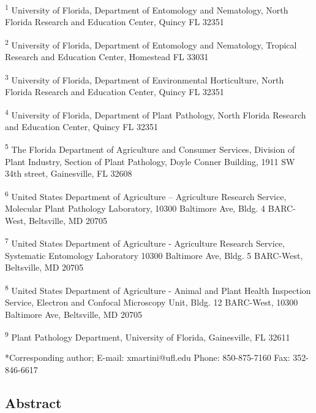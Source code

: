 \documentclass[12pt,final,CPage]{ufthesis}
\begin{document}
{  \textsuperscript{1} University of Florida, Department of Entomology and Nematology, North Florida Research and Education Center, Quincy FL 32351

  \textsuperscript{2} University of Florida, Department of Entomology and Nematology, Tropical Research and Education Center, Homestead FL 33031

  \textsuperscript{3} University of Florida, Department of Environmental Horticulture, North Florida Research and Education Center, Quincy FL 32351

  \textsuperscript{4} University of Florida, Department of Plant Pathology, North Florida Research and Education Center, Quincy FL 32351

  \textsuperscript{5} The Florida Department of Agriculture and Consumer Services, Division of Plant Industry, Section of Plant Pathology, Doyle Conner Building, 1911 SW 34th street, Gainesville, FL 32608

  \textsuperscript{6} United States Department of Agriculture -- Agriculture Research Service, Molecular Plant Pathology Laboratory, 10300 Baltimore Ave, Bldg. 4 BARC-West, Beltsville, MD 20705

  \textsuperscript{7} United States Department of Agriculture - Agriculture Research Service, Systematic Entomology Laboratory 10300 Baltimore Ave, Bldg. 5 BARC-West, Beltsville, MD 20705

  \textsuperscript{8} United States Department of Agriculture - Animal and Plant Health Inspection Service, Electron and Confocal Microscopy Unit, Bldg. 12 BARC-West, 10300 Baltimore Ave, Beltsville, MD 20705

  \textsuperscript{9} Plant Pathology Department, University of Florida, Gainesville, FL 32611

  *Corresponding author; E-mail: xmartini@ufl.edu Phone: 850-875-7160 Fax: 352-846-6617

  \pagebreak

  \hypertarget{abstract}{%
  \subsection{Abstract}\label{abstract}}

}
\end{document}
